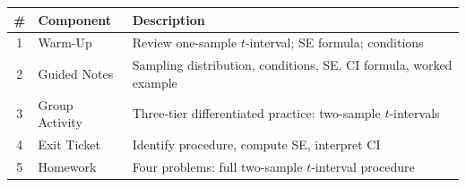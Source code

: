 \documentclass[10pt]{article}
\begin{document}
\begin{tocbox}
\small
\renewcommand{\arraystretch}{1.5}
\begin{tabularx}{\linewidth}{@{} c l X @{}}
\rowcolor{sky}
\textbf{\#} & \textbf{Component} & \textbf{Description} \\
\midrule
1 & Warm-Up        & Review one-sample $t$-interval; SE formula; conditions \\
2 & Guided Notes   & Sampling distribution, conditions, SE, CI formula, worked example \\
3 & Group Activity & Three-tier differentiated practice: two-sample $t$-intervals \\
4 & Exit Ticket    & Identify procedure, compute SE, interpret CI \\
5 & Homework       & Four problems: full two-sample $t$-interval procedure \\
\end{tabularx}
\end{tocbox}
\end{document}
